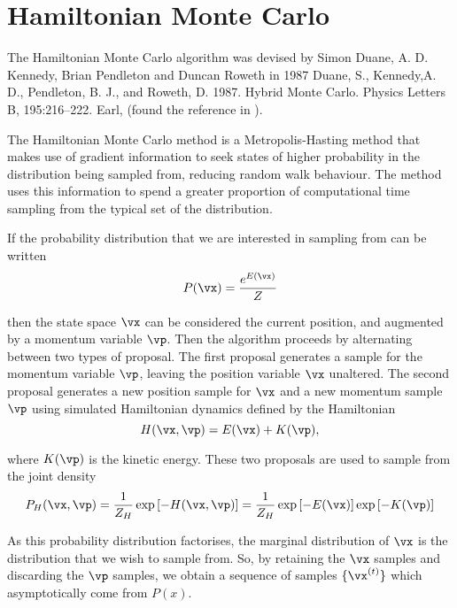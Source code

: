 
\section{Hamiltonian Monte Carlo}


The Hamiltonian Monte Carlo algorithm was devised by Simon Duane, A. D. Kennedy, Brian Pendleton and Duncan
Roweth in 1987 
Duane, S., Kennedy,A. D., Pendleton, B. J., and Roweth, D. 1987. Hybrid Monte Carlo. Physics Letters B, 195:216–222.
Earl,
(found the reference in \cite{Neal2011}).

The Hamiltonian Monte Carlo method is a Metropolis-Hasting method that makes use of gradient information to
seek states of higher probability in the distribution being sampled from, reducing random walk behaviour. The method uses this information to spend a greater proportion of computational time sampling from the typical set of 
the distribution.

If the probability distribution that we are interested in sampling from can be written
\[
	P(\vx) = \frac{e^{E(\vx)}}{Z}
\]

then the state space $\vx$ can be considered the current position, and augmented by a momentum variable
$\vp$. Then the algorithm proceeds by alternating between two types of proposal. The first proposal generates
a sample for the momentum variable $\vp$, leaving the position variable $\vx$ unaltered. The second proposal
generates a new position sample for $\vx$ and a new momentum sample $\vp$ using simulated Hamiltonian dynamics
defined by the Hamiltonian
\[
	H(\vx, \vp) = E(\vx) + K(\vp),
\]

where $K(\vp)$ is the kinetic energy. These two proposals are used to sample from the joint density
\[
	P_H(\vx, \vp) = \frac{1}{Z_H} \exp{[-H(\vx, \vp)]} = \frac{1}{Z_H} \exp{[-E(\vx)]} \exp{[ -K(\vp)]}
\]

As this probability distribution factorises, the marginal distribution of $\vx$ is the distribution that we
wish to sample from. So, by retaining the $\vx$ samples and discarding the $\vp$ samples, we obtain a sequence
of samples $\{ \vx^{(t)} \}$ which asymptotically come from $P(x)$.

